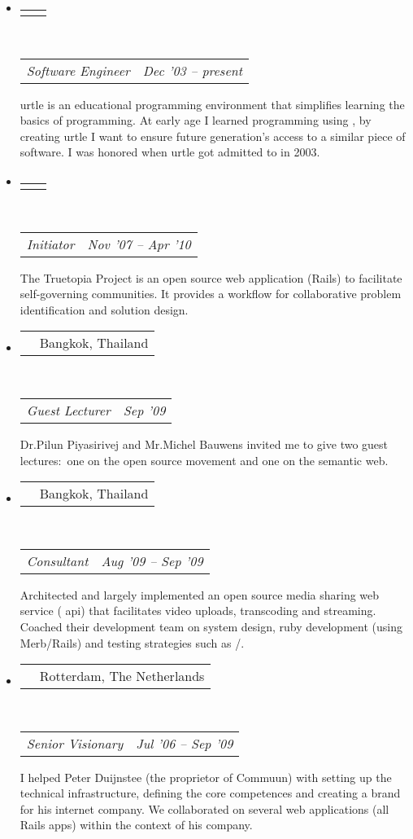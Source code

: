 \documentclass[10pt,a4paper]{article}
\makeatletter
\newcommand{\headerrow}[2]
{\begin{tabular*}{\linewidth}{l@{\extracolsep{\fill}}r}
	\textscale{1.08}{\textbf{#1}} &
	{\sc #2} \\
\end{tabular*}}
\newcommand{\subheaderrow}[2]
{\begin{tabular*}{\linewidth}{l@{\extracolsep{\fill}}r}
	\emph{#1} &
	\emph{#2} \\
\end{tabular*}}
\makeatother
\begin{document}
\begin{itemize}
	\item
	\headerrow
		{\href{http://www.kde.org}{KDE}}
		{}
	\\
	\subheaderrow
		{Software Engineer}
		{Dec '03 -- present}
  urtle is an educational programming environment that simplifies learning the basics of programming. At early age I learned programming using , by creating urtle I want to ensure future generation's access to a similar piece of software. I was honored when urtle got admitted to  in 2003.

	\item
	\headerrow
		{\href{http://www.truetopiaproject.org}{Truetopia Project}}
		{}
	\\
	\subheaderrow
		{Initiator}
		{Nov '07 -- Apr '10}
  The Truetopia Project is an open source web application (Rails) to facilitate self-governing communities. It provides a workflow for collaborative problem identification and solution design.

\pagebreak

	\item
	\headerrow
		{\href{http://www.dpu.ac.th/dpuic}{Dhurakij Pundit University International College}}
		{Bangkok, Thailand}
	\\
	\subheaderrow
		{Guest Lecturer}
		{Sep '09}
  Dr.\@ Pilun Piyasirivej and Mr.\@ Michel Bauwens invited me to give two guest lectures:\ one on the open source movement and one on the semantic web.

	\item
	\headerrow
		{\href{http://www.opendream.th}{Opendream}}
		{Bangkok, Thailand}
	\\
	\subheaderrow
		{\textscale{.85}{IT} Consultant}
    {Aug '09 -- Sep '09}
  Architected and largely implemented an open source media sharing web service ( api) that facilitates video uploads, transcoding and streaming. Coached their development team on system design, ruby development (using Merb/Rails) and testing strategies such as /.

	\item
	\headerrow
		{\href{http://www.commuun.nl}{Commuun}}
		{Rotterdam, The Netherlands}
	\\
	\subheaderrow
		{Senior Visionary}
    {Jul '06 -- Sep '09}
  I helped Peter Duijnstee (the proprietor of Commuun) with setting up the technical infrastructure, defining the core competences and creating a brand for his internet company. We collaborated on several web applications (all Rails apps) within the context of his company.


\end{itemize}
\end{document}
